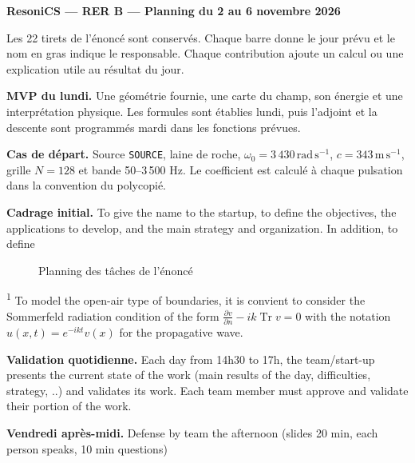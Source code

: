 \documentclass[10pt]{article}
\begin{document}
{\Large\bfseries ResoniCS — RER B — Planning du 2 au 6 novembre 2026}\par
Les 22 tirets de l’énoncé sont conservés. Chaque barre donne le jour prévu et le nom en gras indique le responsable. Chaque contribution ajoute un calcul ou une explication utile au résultat du jour.

\textbf{MVP du lundi.} Une géométrie fournie, une carte du champ, son énergie et une interprétation physique. Les formules sont établies lundi, puis l’adjoint et la descente sont programmés mardi dans les fonctions prévues.

\textbf{Cas de départ.} Source \texttt{SOURCE}, laine de roche, $\omega_0=3\,430\,\mathrm{rad\,s^{-1}}$, $c=343\,\mathrm{m\,s^{-1}}$, grille $N=128$ et bande 50--3\,500 Hz. Le coefficient est calculé à chaque pulsation dans la convention du polycopié.

\textbf{Cadrage initial.} To give the name to the startup, to define the objectives, the applications to develop, and the main strategy and organization. In addition, to define
\begin{figure}[H]
\centering

\caption{Planning des tâches de l'énoncé}
\end{figure}
\textsuperscript{1} To model the open-air type of boundaries, it is convient to consider the Sommerfeld radiation condition of the form $\frac{\partial v}{\partial n} - ik\operatorname{Tr}v = 0$ with the notation $u(x,t) = e^{-ikt}v(x)$ for the propagative wave.

\textbf{Validation quotidienne.} Each day from 14h30 to 17h, the team/start-up presents the current state of the work (main results of the day, difficulties, strategy, ..) and validates its work. Each team member must approve and validate their portion of the work.

\textbf{Vendredi après-midi.} Defense by team the afternoon (slides 20 min, each person speaks, 10 min questions)
\end{document}
